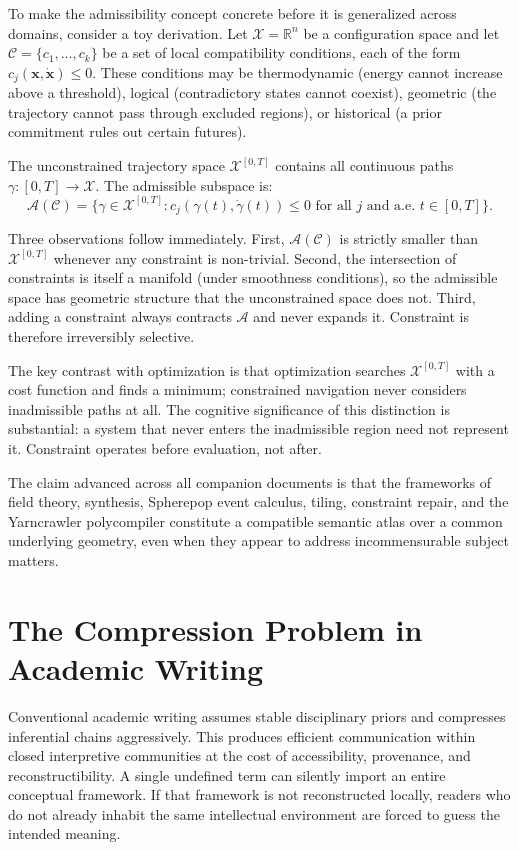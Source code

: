 To make the admissibility concept concrete before it is generalized across domains,
consider a toy derivation. Let $\mathcal{X} = \mathbb{R}^n$ be a configuration space
and let $\mathcal{C} = \{c_1, \ldots, c_k\}$ be a set of local compatibility
conditions, each of the form $c_j(\mathbf{x}, \dot{\mathbf{x}}) \leq 0$. These
conditions may be thermodynamic (energy cannot increase above a threshold), logical
(contradictory states cannot coexist), geometric (the trajectory cannot pass through
excluded regions), or historical (a prior commitment rules out certain futures).

The unconstrained trajectory space $\mathcal{X}^{[0,T]}$ contains all continuous
paths $\gamma: [0,T] \to \mathcal{X}$. The admissible subspace is:
\[
  \mathcal{A}(\mathcal{C}) = \bigl\{\gamma \in \mathcal{X}^{[0,T]}
    : c_j(\gamma(t), \dot{\gamma}(t)) \leq 0
    \text{ for all } j \text{ and a.e. } t \in [0,T]\bigr\}.
\]

Three observations follow immediately. First, $\mathcal{A}(\mathcal{C})$ is strictly
smaller than $\mathcal{X}^{[0,T]}$ whenever any constraint is non-trivial. Second,
the intersection of constraints is itself a manifold (under smoothness conditions),
so the admissible space has geometric structure that the unconstrained space does not.
Third, adding a constraint always contracts $\mathcal{A}$ and never expands it.
Constraint is therefore irreversibly selective.

The key contrast with optimization is that optimization searches $\mathcal{X}^{[0,T]}$
with a cost function and finds a minimum; constrained navigation never considers
inadmissible paths at all. The cognitive significance of this distinction is substantial:
a system that never enters the inadmissible region need not represent it. Constraint
operates before evaluation, not after.

The claim advanced across all companion documents is that the frameworks of \RSVP
field theory, \KES synthesis, Spherepop event calculus, \TARTAN tiling, \CLIO
constraint repair, and the Yarncrawler polycompiler constitute a compatible semantic
atlas over a common underlying geometry, even when they appear to address
incommensurable subject matters.

\section{The Compression Problem in Academic Writing}

Conventional academic writing assumes stable disciplinary priors and compresses
inferential chains aggressively. This produces efficient communication within closed
interpretive communities at the cost of accessibility, provenance, and reconstructibility.
A single undefined term can silently import an entire conceptual framework. If that
framework is not reconstructed locally, readers who do not already inhabit the same
intellectual environment are forced to guess the intended meaning.

